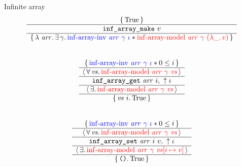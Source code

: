 \begin{frame}{Infinite array}
\small
\[
	\begin{array}{c}
			\triplePretty{
				\iTrue
			}{
				\texttt{inf\_array\_make}\ v
			}{
				\lambda\ \mathit{arr} \ldotp
				\exists \gamma \ldotp
				\textcolor{blue}{\mathrm{inf \mathhyphen array \mathhyphen inv}\ \mathit{arr}\ \gamma\ \iota} \iSep
				\textcolor{red}{\mathrm{inf \mathhyphen array \mathhyphen model}\ \mathit{arr}\ \gamma\ (\lambda \_ \ldotp v)}
			}
		\\\\\\
			\atripleExtPretty{
				\textcolor{blue}{\mathrm{inf \mathhyphen array \mathhyphen inv}\ \mathit{arr}\ \gamma\ \iota} \iSep
				0 \leq i
			}{
				\mathit{vs}
			}{
				\textcolor{red}{\mathrm{inf \mathhyphen array \mathhyphen model}\ \mathit{arr}\ \gamma\ \mathit{vs}}
			}{
				\texttt{inf\_array\_get}\ \mathit{arr}\ i
			}{
				\uparrow\iota
			}{
			}{
				\textcolor{red}{\mathrm{inf \mathhyphen array \mathhyphen model}\ \mathit{arr}\ \gamma\ \mathit{vs}}
			}{
				\mathit{vs}\ i
			}{
				\iTrue
			}
		\\\\\\
			\atripleExtPretty{
				\textcolor{blue}{\mathrm{inf \mathhyphen array \mathhyphen inv}\ \mathit{arr}\ \gamma\ \iota} \iSep
				0 \leq i
			}{
				\mathit{vs}
			}{
				\textcolor{red}{\mathrm{inf \mathhyphen array \mathhyphen model}\ \mathit{arr}\ \gamma\ \mathit{vs}}
			}{
				\texttt{inf\_array\_set}\ \mathit{arr}\ i\ v
			}{
				\uparrow\iota
			}{
			}{
				\textcolor{red}{\mathrm{inf \mathhyphen array \mathhyphen model}\ \mathit{arr}\ \gamma\ \mathit{vs} [i \mapsto v]}
			}{
				\exprUnit
			}{
				\iTrue
			}
	\end{array}
\]
\end{frame}